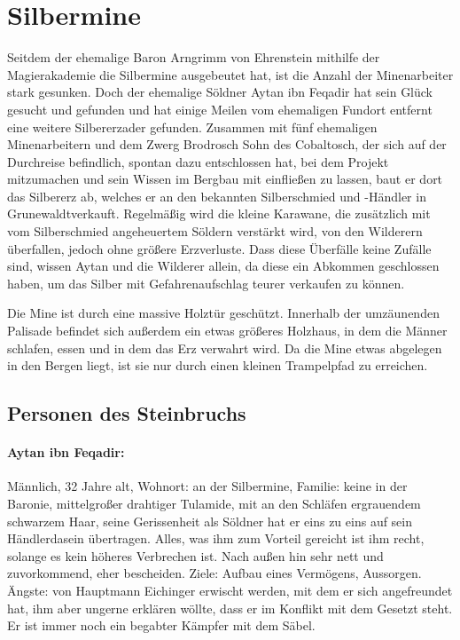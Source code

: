 \section{Silbermine}
Seitdem der ehemalige Baron Arngrimm von Ehrenstein mithilfe der Magierakademie die Silbermine ausgebeutet hat, ist die Anzahl der Minenarbeiter stark gesunken. Doch der ehemalige Söldner Aytan ibn Feqadir hat sein Glück gesucht und gefunden und hat einige Meilen vom ehemaligen Fundort entfernt eine weitere Silbererzader gefunden. Zusammen mit fünf ehemaligen Minenarbeitern und dem Zwerg Brodrosch Sohn des Cobaltosch, der sich auf der Durchreise befindlich, spontan dazu entschlossen hat, bei dem Projekt mitzumachen und sein Wissen im Bergbau mit einfließen zu lassen, baut er dort das Silbererz ab, welches er an den bekannten Silberschmied und -Händler in Grunewaldtverkauft. Regelmäßig wird die kleine Karawane, die zusätzlich mit vom Silberschmied angeheuertem Söldern verstärkt wird, von den Wilderern überfallen, jedoch ohne größere Erzverluste. Dass diese Überfälle keine Zufälle sind, wissen Aytan und die Wilderer allein, da diese ein Abkommen geschlossen haben, um das Silber mit Gefahrenaufschlag teurer verkaufen zu können.

Die Mine ist durch eine massive Holztür geschützt. Innerhalb der umzäunenden Palisade befindet sich außerdem ein etwas größeres Holzhaus, in dem die Männer schlafen, essen und in dem das Erz verwahrt wird. Da die Mine etwas abgelegen in den Bergen liegt, ist sie nur durch einen kleinen Trampelpfad zu erreichen.

\subsection{Personen des Steinbruchs}
\paragraph{Aytan ibn Feqadir:} Männlich, 32 Jahre alt, Wohnort: an der Silbermine, Familie: keine in der Baronie, mittelgroßer drahtiger Tulamide, mit an den Schläfen ergrauendem schwarzem Haar, seine Gerissenheit als Söldner hat er eins zu eins auf sein Händlerdasein übertragen. Alles, was ihm zum Vorteil gereicht ist ihm recht, solange es kein höheres Verbrechen ist. Nach außen hin sehr nett und zuvorkommend, eher bescheiden. Ziele: Aufbau eines Vermögens, Aussorgen. Ängste: von Hauptmann Eichinger erwischt werden, mit dem er sich angefreundet hat, ihm aber ungerne erklären wöllte, dass er im Konflikt mit dem Gesetzt steht. Er ist immer noch ein begabter Kämpfer mit dem Säbel.


